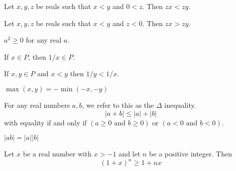\documentclass[11pt]{article}
\begin{document}
\begin{proposition}\label{1.3.5} Let \( x, y, z \) be reals such that \( x < y \) and \( 0 < z \). Then \( zx < zy \).
\end{proposition}

\begin{corollary}\label{1.3.6}
    Let \( x, y, z \) be reals such that \( x < y \) and \( z < 0 \). Then \( zx > zy \).
\end{corollary}

\begin{corollary}\label{1.3.7}
    \( a^2 \geq 0 \) for any real \( a \).
\end{corollary}

\begin{proposition}\label{1.3.8}
    If \( x \in P \), then \( 1/x \in P \).
\end{proposition}

\begin{corollary}\label{1.3.9}
    If \( x, y \in P \) and \( x < y \) then \( 1/y < 1/x \).
\end{corollary}

\begin{example}\label{1.3.12}
    \(\max(x, y) = -\min(-x, -y)\)
\end{example}

\begin{theorem}\label{1.3.14}
    For any real numbers \( a, b \), we refer to this as the \(\Delta\) inequality.
    \[
        |a + b| \leq |a| + |b|
    \]
    with equality if and only if \( (a \geq 0 \text{ and } b \geq 0) \) or \( (a <
    0 \text{ and } b < 0) \).
\end{theorem}
\begin{proposition}\label{1.3.15}
    \( |ab| = |a||b| \)
\end{proposition}
\begin{theorem}\label{1.3.16}
     Let \( x \) be a real number with \( x > -1 \) and let \( n \) be a positive integer. Then
    \[
        {(1 + x)}^n \geq 1 + nx
    \]
\end{theorem}
\end{document}
